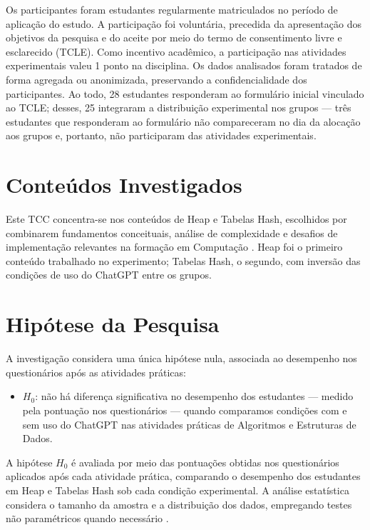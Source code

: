 Os participantes foram estudantes regularmente matriculados no período de aplicação do estudo. A participação foi voluntária, precedida da apresentação dos objetivos da pesquisa e do aceite por meio do termo de consentimento livre e esclarecido (TCLE). Como incentivo acadêmico, a participação nas atividades experimentais valeu 1 ponto na disciplina. Os dados analisados foram tratados de forma agregada ou anonimizada, preservando a confidencialidade dos participantes. Ao todo, 28 estudantes responderam ao formulário inicial vinculado ao TCLE; desses, 25 integraram a distribuição experimental nos grupos --- três estudantes que responderam ao formulário não compareceram no dia da alocação aos grupos e, portanto, não participaram das atividades experimentais.

\section{Conteúdos Investigados}
\label{sec:conteudos-investigados}

Este TCC concentra-se nos conteúdos de Heap e Tabelas Hash, escolhidos por combinarem fundamentos conceituais, análise de complexidade e desafios de implementação relevantes na formação em Computação \cite{cormen2022introduction}. Heap foi o primeiro conteúdo trabalhado no experimento; Tabelas Hash, o segundo, com inversão das condições de uso do ChatGPT entre os grupos.

\section{Hipótese da Pesquisa}
\label{sec:hipotese-pesquisa}

A investigação considera uma única hipótese nula, associada ao desempenho nos questionários após as atividades práticas:

\begin{itemize}
    \item $H_{0}$: não há diferença significativa no desempenho dos estudantes --- medido pela pontuação nos questionários --- quando comparamos condições com e sem uso do ChatGPT nas atividades práticas de Algoritmos e Estruturas de Dados.
\end{itemize}

A hipótese $H_{0}$ é avaliada por meio das pontuações obtidas nos questionários aplicados após cada atividade prática, comparando o desempenho dos estudantes em Heap e Tabelas Hash sob cada condição experimental. A análise estatística considera o tamanho da amostra e a distribuição dos dados, empregando testes não paramétricos quando necessário \cite{kitchenham2019statistical,sheskin2003handbook}.


